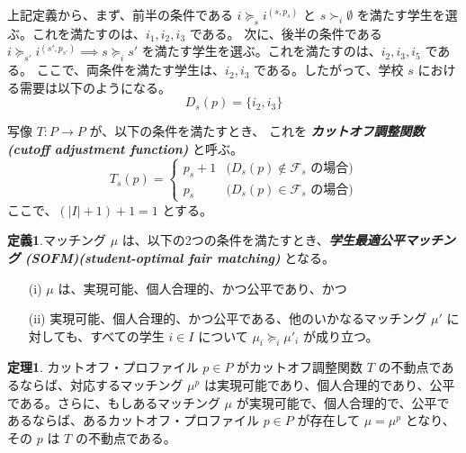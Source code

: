 \documentclass[12pt, a4paper]{article}
\theoremstyle{definition}
\theoremstyle{remark}
\theoremstyle{plain}
\begin{document}
上記定義から、まず、前半の条件である \( i \succeq_s i^{(s,p_s)} \) と \( s \succ_i \emptyset \) を満たす学生を選ぶ。これを満たすのは、\( i_1, i_2, i_3 \) である。
次に、後半の条件である \( i \succeq_{s'} i^{(s',p_{s'})} \implies s \succeq_i s' \) を満たす学生を選ぶ。これを満たすのは、\( i_2, i_3, i_5 \) である。
ここで、両条件を満たす学生は、\( i_2, i_3 \) である。したがって、学校 \( s \) における需要は以下のようになる。
\[
D_s(p) = \{i_2, i_3\}
\]




写像 $T: P \to P$ が、以下の条件を満たすとき、
これを \textbf{\textit{カットオフ調整関数 (cutoff adjustment function)}} と呼ぶ。
\[
    T_s(p) =
    \begin{cases}
        p_s + 1 & \text{($D_s(p) \notin \mathcal{F}_s$ の場合)} \\
        p_s     & \text{($D_s(p) \in \mathcal{F}_s$ の場合)}
    \end{cases}
\]
ここで、\( (|I| + 1) + 1 = 1 \) とする。


\textbf{定義1}.マッチング $\mu$ は、以下の2つの条件を満たすとき、\textbf{\textit{学生最適公平マッチング (SOFM)(student-optimal fair matching) }} となる。
\begin{itemize}
    \item[(i)] $\mu$ は、実現可能、個人合理的、かつ公平であり、かつ
    \item[(ii)] 実現可能、個人合理的、かつ公平である、他のいかなるマッチング $\mu'$ に対しても、すべての学生 $i \in I$ について $\mu_i \succeq_i \mu'_i$ が成り立つ。
\end{itemize}


\textbf{定理1}. カットオフ・プロファイル $p \in P$ がカットオフ調整関数 $T$ の不動点であるならば、対応するマッチング $\mu^p$ は実現可能であり、個人合理的であり、公平である。さらに、もしあるマッチング $\mu$ が実現可能で、個人合理的で、公平であるならば、あるカットオフ・プロファイル $p \in P$ が存在して $\mu = \mu^p$ となり、その $p$ は $T$ の不動点である。
\end{document}
